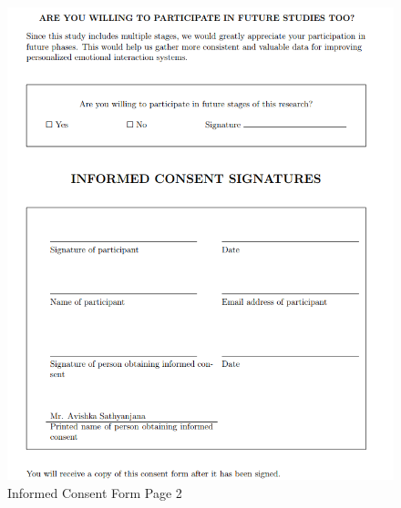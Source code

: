\begin{figure}[H]
    \centering
    \includegraphics[width=1\textwidth]{appendix/imgs/consent-pg2.png}
    \caption{Informed Consent Form Page 2}
\end{figure}




